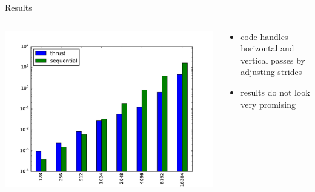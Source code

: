 \documentclass{beamer}
\begin{document}
\begin{frame}{Results}
  \begin{columns}
    \begin{column}{7cm}
      \includegraphics[scale=0.4]{imgs/thrust_vs_sequential_total.pdf} 
    \end{column}
    \begin{column}{3cm}
      \begin{itemize}
        \item code handles horizontal and vertical passes by adjusting
          strides
        \item results do not look very promising
      \end{itemize}
    \end{column}
  \end{columns}
\end{frame} 
\end{document}
